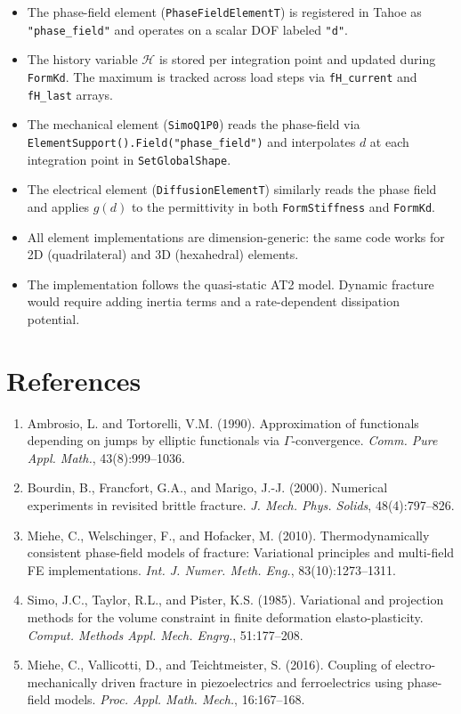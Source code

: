 \documentclass[11pt,a4paper]{article}
\begin{document}
\begin{itemize}[nosep]
    \item The phase-field element (\texttt{PhaseFieldElementT}) is registered in Tahoe as \texttt{"phase\_field"} and operates on a scalar DOF labeled \texttt{"d"}.
    \item The history variable $\mathcal{H}$ is stored per integration point and updated during \texttt{FormKd}. The maximum is tracked across load steps via \texttt{fH\_current} and \texttt{fH\_last} arrays.
    \item The mechanical element (\texttt{SimoQ1P0}) reads the phase-field via \texttt{ElementSupport().Field("phase\_field")} and interpolates $d$ at each integration point in \texttt{SetGlobalShape}.
    \item The electrical element (\texttt{DiffusionElementT}) similarly reads the phase field and applies $g(d)$ to the permittivity in both \texttt{FormStiffness} and \texttt{FormKd}.
    \item All element implementations are dimension-generic: the same code works for 2D (quadrilateral) and 3D (hexahedral) elements.
    \item The implementation follows the quasi-static AT2 model. Dynamic fracture would require adding inertia terms and a rate-dependent dissipation potential.
\end{itemize}

\section*{References}

\begin{enumerate}[nosep]
    \item Ambrosio, L. and Tortorelli, V.M. (1990). Approximation of functionals depending on jumps by elliptic functionals via $\Gamma$-convergence. \textit{Comm. Pure Appl. Math.}, 43(8):999--1036.
    \item Bourdin, B., Francfort, G.A., and Marigo, J.-J. (2000). Numerical experiments in revisited brittle fracture. \textit{J. Mech. Phys. Solids}, 48(4):797--826.
    \item Miehe, C., Welschinger, F., and Hofacker, M. (2010). Thermodynamically consistent phase-field models of fracture: Variational principles and multi-field FE implementations. \textit{Int. J. Numer. Meth. Eng.}, 83(10):1273--1311.
    \item Simo, J.C., Taylor, R.L., and Pister, K.S. (1985). Variational and projection methods for the volume constraint in finite deformation elasto-plasticity. \textit{Comput. Methods Appl. Mech. Engrg.}, 51:177--208.
    \item Miehe, C., Vallicotti, D., and Teichtmeister, S. (2016). Coupling of electro-mechanically driven fracture in piezoelectrics and ferroelectrics using phase-field models. \textit{Proc. Appl. Math. Mech.}, 16:167--168.
\end{enumerate}
\end{document}
